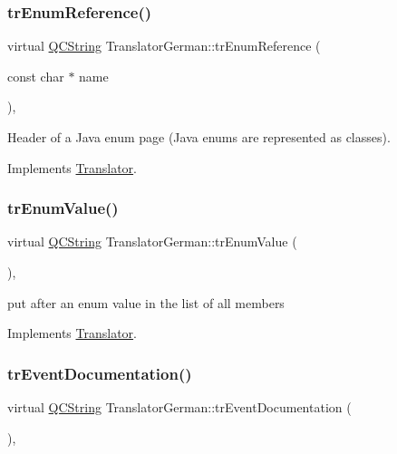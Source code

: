 \subsubsection{\texorpdfstring{trEnumReference()}{trEnumReference()}}
{\footnotesize\ttfamily virtual \mbox{\hyperlink{class_q_c_string}{Q\+C\+String}} Translator\+German\+::tr\+Enum\+Reference (\begin{DoxyParamCaption}\item[{const char $\ast$}]{name }\end{DoxyParamCaption})\hspace{0.3cm}{\ttfamily [inline]}, {\ttfamily [virtual]}}

Header of a Java enum page (Java enums are represented as classes). 

Implements \mbox{\hyperlink{class_translator}{Translator}}.

\mbox{\label{class_translator_german_ae091b1418a7c22394f75ef8e3bf348cb}} 
\subsubsection{\texorpdfstring{trEnumValue()}{trEnumValue()}}
{\footnotesize\ttfamily virtual \mbox{\hyperlink{class_q_c_string}{Q\+C\+String}} Translator\+German\+::tr\+Enum\+Value (\begin{DoxyParamCaption}{ }\end{DoxyParamCaption})\hspace{0.3cm}{\ttfamily [inline]}, {\ttfamily [virtual]}}

put after an enum value in the list of all members 

Implements \mbox{\hyperlink{class_translator}{Translator}}.

\mbox{\label{class_translator_german_a33965bad26af13e2fc6a60315747e468}} 
\subsubsection{\texorpdfstring{trEventDocumentation()}{trEventDocumentation()}}
{\footnotesize\ttfamily virtual \mbox{\hyperlink{class_q_c_string}{Q\+C\+String}} Translator\+German\+::tr\+Event\+Documentation (\begin{DoxyParamCaption}{ }\end{DoxyParamCaption})\hspace{0.3cm}{\ttfamily [inline]}, {\ttfamily [virtual]}}

